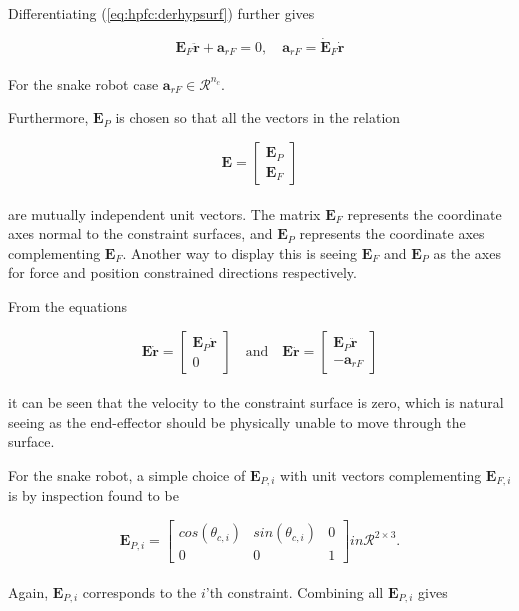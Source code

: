 Differentiating (\ref{eq:hpfc:derhypsurf}) further gives

\begin{equation}\label{eq:dhpfc_arf}
    \mathbf{E}_F \mathbf{\ddot{r}} + \mathbf{a}_{r F} = 0, \quad \mathbf{a}_{r F} = \mathbf{\dot{E}}_F\mathbf{\dot{r}}
\end{equation}
\\
For the snake robot case $\mathbf{a}_{r F} \in \mathcal{R}^{n_c}$.

Furthermore, $\mathbf{E}_P$ is chosen so that all the vectors in the relation

\begin{equation}\label{eq:dhpfc_E}
    \mathbf{E} =
    \begin{bmatrix}
    \mathbf{E}_P \\ \mathbf{E}_F
    \end{bmatrix}
\end{equation}
\\
are mutually independent unit vectors. The matrix $\mathbf{E}_F$ represents the coordinate axes normal to the constraint surfaces, and $\mathbf{E}_P$ represents the coordinate axes complementing $\mathbf{E}_F$. Another way to display this is seeing $\mathbf{E}_F$ and $\mathbf{E}_P$ as the axes for force and position constrained directions respectively.

From the equations

\begin{equation}
    \mathbf{E\dot{r}} =
    \begin{bmatrix}
        \mathbf{E}_P \mathbf{\dot{r}}\\
        0
    \end{bmatrix}
    \quad \text{and} \quad
    \mathbf{E\ddot{r}} =
    \begin{bmatrix}
        \mathbf{E}_P \mathbf{\ddot{r}} \\
        -\mathbf{a}_{r F}
    \end{bmatrix}
\end{equation}
\\
it can be seen that the velocity to the constraint surface is zero, which is natural seeing as the end-effector should be physically unable to move through the surface.

For the snake robot, a simple choice of $\mathbf{E}_{P,i}$ with unit vectors complementing $\mathbf{E}_{F,i}$ is by inspection found to be

\begin{equation}\label{eq:dhpfc_EPi}
    \mathbf{E}_{P,i} = 
    \begin{bmatrix}
        cos(\theta_{c,i}) & sin(\theta_{c,i}) & 0 \\
        0 & 0 & 1
    \end{bmatrix} in \mathcal{R}^{2\times 3}.
\end{equation}
\\
Again, $\mathbf{E}_{P,i}$ corresponds to the $i$'th constraint. Combining all $\mathbf{E}_{P,i}$ gives 

